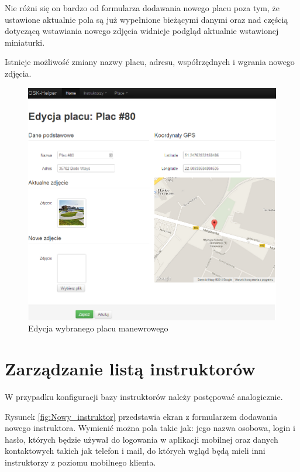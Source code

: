 \documentclass[twoside,a4paper,openright,12pt]{book}
\begin{document}
Nie różni się on bardzo od formularza dodawania nowego placu poza tym, że ustawione aktualnie pola są już wypełnione bieżącymi danymi oraz nad częścią dotyczącą wstawiania nowego zdjęcia widnieje podgląd aktualnie wstawionej miniaturki.

Istnieje możliwość zmiany nazwy placu, adresu, współrzędnych i wgrania nowego zdjęcia.

\begin{figure}[h!]
\centering
\includegraphics[width=1\textwidth]{screenshots/panel/edycja_placu.png}
\caption{Edycja wybranego placu manewrowego}
\label{fig:Edycja_placu}
\end{figure}

\newpage
\section{Zarządzanie listą instruktorów}

W przypadku konfiguracji bazy instruktorów należy postępować analogicznie.

Rysunek \ref{fig:Nowy_instruktor} przedstawia ekran z formularzem dodawania nowego instruktora. Wymienić można pola takie jak: jego nazwa osobowa, login i hasło, których będzie używał do logowania w aplikacji mobilnej oraz danych kontaktowych takich jak telefon i mail, do których wgląd będą mieli inni instruktorzy z poziomu mobilnego klienta.
\end{document}
